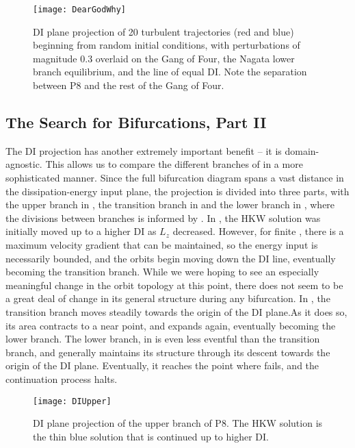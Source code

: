 \begin{figure}[h]
\texttt{[image: DearGodWhy]}
\caption{DI plane projection of 20 turbulent trajectories (red and blue) beginning from random initial conditions, with perturbations of magnitude $0.3$ overlaid on the Gang of Four, the Nagata lower branch equilibrium, and the line of equal DI. Note the separation between P8 and the rest of the Gang of Four.}\label{fig:turbDI}
\end{figure}

\subsection{The Search for Bifurcations, Part II}
The DI projection has another extremely important benefit -- it is domain-agnostic. This allows us to compare the different branches of  in a more sophisticated manner. Since the full bifurcation diagram spans a vast distance in the dissipation-energy input plane, the projection is divided into three parts, with the upper branch in , the transition branch in  and the lower branch in , where the divisions between branches is informed by . In , the HKW solution was initially moved up to a higher DI as $L_z$ decreased. However, for finite \ReN, there is a maximum velocity gradient that can be maintained, so the energy input is necessarily bounded, and the orbits begin moving down the DI line, eventually becoming the transition branch. While we were hoping to see an especially meaningful change in the orbit topology at this point, there does not seem to be a great deal of change in its general structure during any bifurcation. In , the transition branch moves steadily towards the origin of the DI plane.As it does so, its area contracts to a near point, and expands again, eventually becoming the lower branch. The lower branch, in  is even less eventful than the transition branch, and generally maintains its structure through its descent towards the origin of the DI plane. Eventually, it reaches the point where  fails, and the continuation process halts.\\
 

\begin{figure}[h]
\texttt{[image: DIUpper]}
\caption{DI plane projection of the upper branch of P8. The HKW solution is the thin blue solution that is continued up to higher DI.}\label{fig:DIUpper}
\end{figure}

